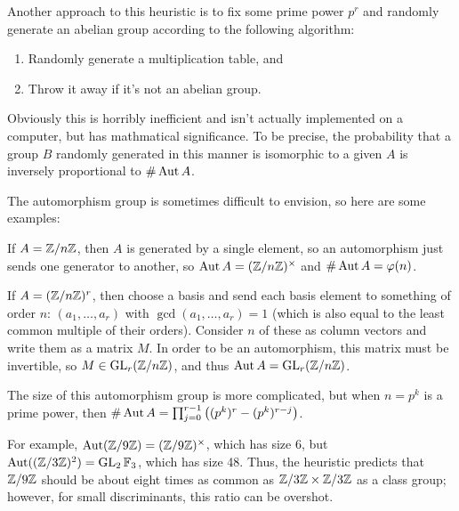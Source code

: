 Another approach to this heuristic is to fix some prime power $p^r$ and randomly generate an abelian group according to the following algorithm:
\begin{enumerate}
\item Randomly generate a multiplication table, and
\item Throw it away if it's not an abelian group.
\end{enumerate}
Obviously this is horribly inefficient and isn't actually implemented on a computer, but has mathmatical significance. To be precise, the probability that a group $B$ randomly generated in this manner is isomorphic to a given $A$ is inversely proportional to $\#\operatorname{Aut} A$.

The automorphism group is sometimes difficult to envision, so here are some examples:

If $A = \mathbb{Z}/n\mathbb{Z}$, then $A$ is generated by a single element, so an automorphism just sends one generator to another, so $\operatorname{Aut} A = (\mathbb{Z}/n\mathbb{Z})^\times$ and $\#\operatorname{Aut} A = \varphi(n)$.

If $A = (\mathbb{Z}/n\mathbb{Z})^r$, then choose a basis and send each basis element to something of order $n$: $(a_1,\dots,a_r)$ with $\gcd(a_1,\dots,a_r) = 1$ (which is also equal to the least common multiple of their orders). Consider $n$ of these as column vectors and write them as a matrix $M$. In order to be an automorphism, this matrix must be invertible, so $M\in\operatorname{GL}_{r}(\mathbb{Z}/n\mathbb{Z})$, and thus $\operatorname{Aut} A = \operatorname{GL}_{r}(\mathbb{Z}/n\mathbb{Z})$.

The size of this automorphism group is more complicated, but when $n = p^k$ is a prime power, then $\#\operatorname{Aut} A = \prod_{j=0}^{r-1} \left((p^k)^r - (p^k)^{r-j}\right)$.

For example, $\operatorname{Aut}(\mathbb{Z}/9\mathbb{Z}) = (\mathbb{Z}/9\mathbb{Z})^\times$, which has size 6, but $\operatorname{Aut}((\mathbb{Z}/3\mathbb{Z})^2) = \operatorname{GL}_{2}\mathbb F_3$, which has size 48. Thus, the heuristic predicts that $\mathbb{Z}/9\mathbb{Z}$ should be about eight times as common as $\mathbb{Z}/3\mathbb{Z}\times\mathbb{Z}/3\mathbb{Z}$ as a class group; however, for small discriminants, this ratio can be overshot.
